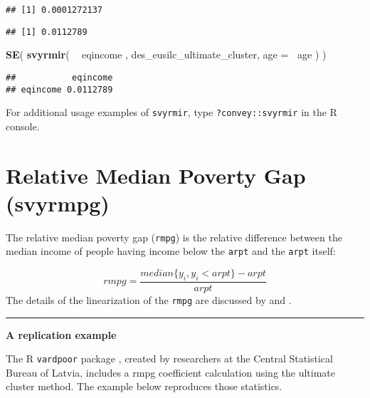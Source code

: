 \documentclass[]{book}
\newenvironment{Shaded}{\begin{snugshade}}{\end{snugshade}}
\newcommand{\CommentTok}[1]{\textcolor[rgb]{0.56,0.35,0.01}{\textit{#1}}}
\newcommand{\DataTypeTok}[1]{\textcolor[rgb]{0.13,0.29,0.53}{#1}}
\newcommand{\KeywordTok}[1]{\textcolor[rgb]{0.13,0.29,0.53}{\textbf{#1}}}
\newcommand{\NormalTok}[1]{#1}
\newcommand{\OperatorTok}[1]{\textcolor[rgb]{0.81,0.36,0.00}{\textbf{#1}}}
\newcommand{\StringTok}[1]{\textcolor[rgb]{0.31,0.60,0.02}{#1}}
\begin{document}
\begin{verbatim}
## [1] 0.0001272137
\end{verbatim}

\begin{Shaded}
\end{Shaded}

\begin{verbatim}
## [1] 0.0112789
\end{verbatim}

\begin{Shaded}
\begin{Highlighting}[]
\KeywordTok{SE}\NormalTok{( }\KeywordTok{svyrmir}\NormalTok{( }\OperatorTok{~}\StringTok{ }\NormalTok{eqincome , des_eusilc_ultimate_cluster, }\DataTypeTok{age =} \OperatorTok{~}\NormalTok{age ) ) }
\end{Highlighting}
\end{Shaded}

\begin{verbatim}
##           eqincome
## eqincome 0.0112789
\end{verbatim}

For additional usage examples of \texttt{svyrmir}, type \texttt{?convey::svyrmir} in the R console.

\hypertarget{relative-median-poverty-gap-svyrmpg}{%
\section{Relative Median Poverty Gap (svyrmpg)}\label{relative-median-poverty-gap-svyrmpg}}

The relative median poverty gap (\texttt{rmpg}) is the relative difference between the median income of people having income below the \texttt{arpt} and the \texttt{arpt} itself:

\[
rmpg = \frac{median\{y_i, y_i<arpt\}-arpt}{arpt}
\]
The details of the linearization of the \texttt{rmpg} are discussed by \citet{deville1999} and \citet{osier2009}.

\begin{center}\rule{0.5\linewidth}{0.5pt}\end{center}

\textbf{A replication example}

The R \texttt{vardpoor} package \citep{vardpoor}, created by researchers at the Central Statistical Bureau of Latvia, includes a rmpg coefficient calculation using the ultimate cluster method. The example below reproduces those statistics.
\end{document}
